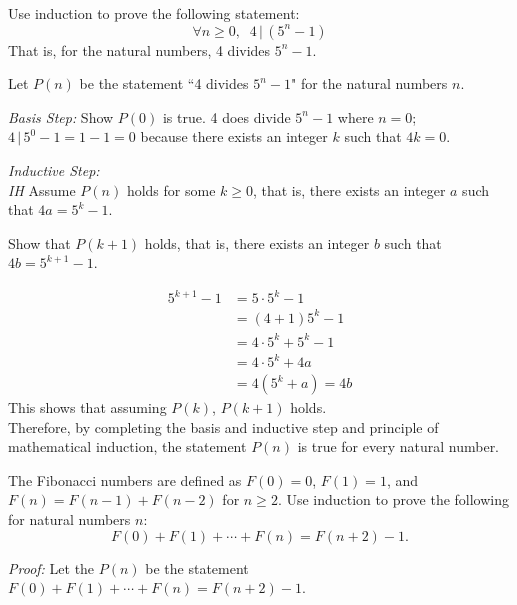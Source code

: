 \begin{questions}
\begin{solution}
\end{solution}




 Use induction to prove the following statement:
    \[\forall n \geq 0, \;\; 4 \,|\, (5^{n} - 1)\]
That is, for the natural numbers, 4 divides $5^n - 1$.
    \ifprintanswers
        \vspace{-10pt}
   \fi
\begin{solution}
Let $P(n)$ be the statement ``4 divides $5^n - 1$" for the natural numbers $n$. 

\textit{Basis Step:} Show $P(0)$ is true. 
    4 does divide $5^n - 1$ where $n=0$;  $4 \,|\, 5^0 - 1 = 1 - 1 = 0$ because there exists an integer $k$ such that $4k = 0$.

\textit{Inductive Step:} \\
\textit{IH} Assume $P(n)$ holds for some $k \geq 0$, that is, there exists an integer $a$ such that $4a = 5^k - 1$. 

Show that $P(k+1)$ holds, that is, there exists an integer $b$ such that $4b = 5^{k+1} - 1$. 

\begin{align*}
    5^{k+1} - 1 &= 5\cdot 5^{k} - 1 \\
     &= (4 + 1)5^{k} - 1 \\
     &= 4\cdot 5^{k} + 5^{k} - 1 \\
     &= 4\cdot 5^{k} + 4a \tag{Ind. Hyp.} \\
     &= 4(5^{k} + a)
     = 4b
\end{align*}
This shows that assuming $P(k)$, $P(k+1)$ holds. \\
Therefore, by completing the basis and inductive step and principle of mathematical induction, the statement $P(n)$ is true for every natural number.
\end{solution}




\bonusquestion[6] The Fibonacci numbers are defined as $F(0) = 0$, $F(1) = 1$, and $F(n) = F(n-1) + F(n-2)$ for $n \geq 2$.   Use induction to prove the following for natural numbers $n$:
\[ F(0) + F(1) + \cdots + F(n) = F(n+2) - 1.  \]
    \ifprintanswers
        \vspace{-10pt}
   \fi
\begin{solution}
  \textit{Proof:}
  Let the $P(n)$ be the statement $F(0) + F(1) + \cdots + F(n) = F(n+2) -1$.


\end{solution}
\end{questions}
